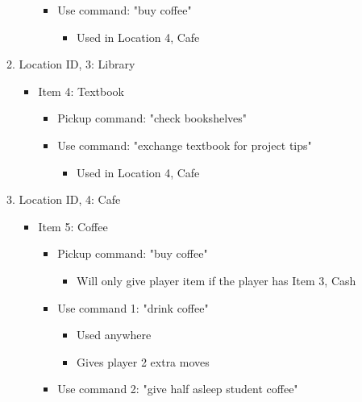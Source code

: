 \documentclass[11pt]{article}
\begin{document}
\begin{enumerate}
\begin{enumerate}
\begin{itemize}
\begin{itemize}
\begin{itemize}
                                                \end{itemize}
                                                \item Use command: "buy coffee"
                                                \begin{itemize}
                                                    \item Used in Location 4, Cafe
                                                \end{itemize}
        \end{itemize}
    \end{itemize}
    \item  Location ID, 3: Library
    \begin{itemize}
        \item Item 4: Textbook
        \begin{itemize}
            \item Pickup command: "check bookshelves"
            \item Use command: "exchange textbook for project tips"
            \begin{itemize}
                \item Used in Location 4, Cafe
            \end{itemize}
        \end{itemize}
    \end{itemize}
    \item Location ID, 4: Cafe
    \begin{itemize}
        \item Item 5: Coffee
        \begin{itemize}
            \item Pickup command: "buy coffee"
            \begin{itemize}
                \item Will only give player item if the player has Item 3, Cash
            \end{itemize}
            \item Use command 1: "drink coffee"
            \begin{itemize}
                \item Used anywhere
                \item Gives player 2 extra moves
            \end{itemize}
            \item Use command 2: "give half asleep student coffee"
            \begin{itemize}

\end{itemize}
\end{itemize}
\end{itemize}
\end{enumerate}
\end{enumerate}
\end{document}
